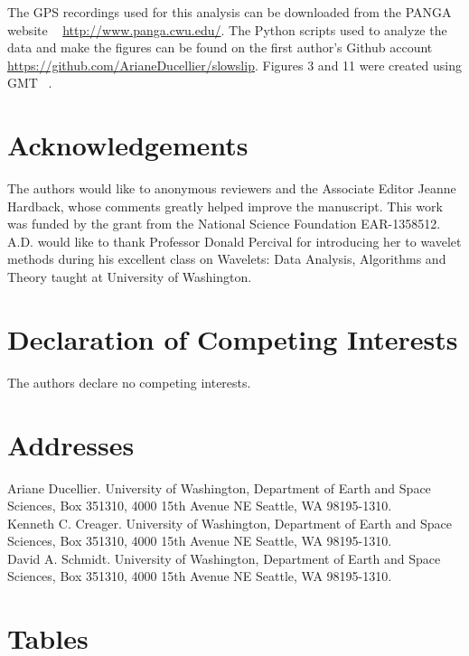 \documentclass{article}
\begin{document}
The GPS recordings used for this analysis can be downloaded from the PANGA website ~\citep{PANGA} \url{http://www.panga.cwu.edu/}. The Python scripts used to analyze the data and make the figures can be found on the first author's Github account \url{https://github.com/ArianeDucellier/slowslip}. Figures 3 and 11 were created using GMT ~\citep{WES_1991}.

\section*{Acknowledgements}

The authors would like to anonymous reviewers and the Associate Editor Jeanne Hardback, whose comments greatly helped improve the manuscript. This work was funded by the grant from the National Science Foundation EAR-1358512. A.D. would like to thank Professor Donald Percival for introducing her to wavelet methods during his excellent class on Wavelets: Data Analysis, Algorithms and Theory taught at University of Washington.   

\section*{Declaration of Competing Interests}

The authors declare no competing interests.




\newpage

\section*{Addresses}

Ariane Ducellier. University of Washington, Department of Earth and Space Sciences, Box 351310, 4000 15th Avenue NE Seattle, WA 98195-1310. \\

Kenneth C. Creager. University of Washington, Department of Earth and Space Sciences, Box 351310, 4000 15th Avenue NE Seattle, WA 98195-1310. \\

David A. Schmidt. University of Washington, Department of Earth and Space Sciences, Box 351310, 4000 15th Avenue NE Seattle, WA 98195-1310.

\newpage

\section*{Tables}
\end{document}
